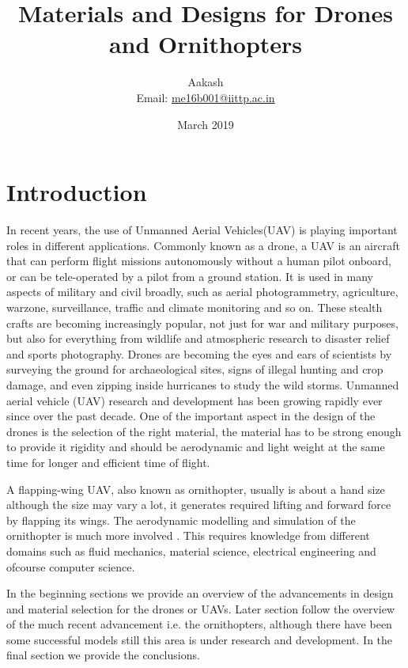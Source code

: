 \documentclass{article}
\title{Materials and Designs for Drones and Ornithopters}
\author{Aakash \\ Email: \href{mailto:me16b001@iittp.ac.in}{me16b001@iittp.ac.in}}
\date{March 2019}
\begin{document}
\maketitle

\section{Introduction}
In recent years, the use of Unmanned Aerial Vehicles(UAV) is playing important roles in different applications. Commonly known as a drone, a UAV is an aircraft that can perform flight missions autonomously without a human pilot onboard, or can be tele-operated by a pilot from a ground station. It is used in many aspects of military and civil broadly, such as aerial photogrammetry, agriculture, warzone, surveillance, traffic and climate monitoring and so on. These stealth crafts are becoming increasingly popular, not just for war and military purposes, but also for everything from wildlife and atmospheric research to disaster relief and sports photography. Drones are becoming the eyes and ears of scientists by surveying the ground for archaeological sites, signs of illegal hunting and crop damage, and even zipping inside hurricanes to study the wild storms. 
 Unmanned aerial vehicle (UAV) research and development has been growing rapidly ever since over the past decade. One of the important aspect in the design of the drones is the selection of the right material, the material has to be strong enough to provide it rigidity and should be aerodynamic and light weight at the same time for longer and efficient time of flight.  

A flapping-wing UAV, also known as ornithopter, usually is about a hand size although the size may vary a lot, it generates required lifting and forward force by flapping its wings. The aerodynamic modelling and simulation of the ornithopter is much more involved \citep{peterson}. This requires knowledge from different domains such as fluid mechanics, material science, electrical engineering and ofcourse computer science.

In the beginning sections we provide an overview of the advancements in design and material selection for the drones or UAVs. Later section follow the overview of the much recent advancement i.e. the ornithopters, although there have been some successful models still this area is under research and development. In the final section we provide the conclusions.
\end{document}
